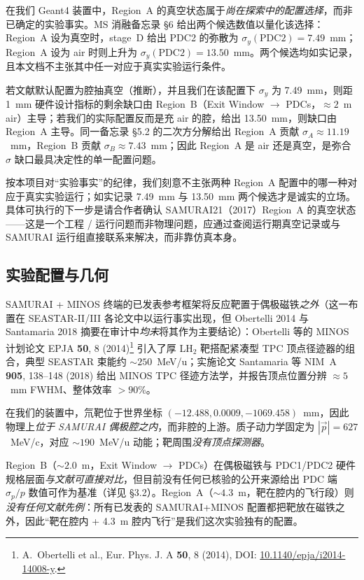 \documentclass[a4paper, 11pt]{article}
\begin{document}
在我们 Geant4 装置中，Region~A 的真空状态属于\emph{尚在探索中的配置选择}，而非已确定的实验事实。MS 消融备忘录 §6 给出两个候选数值以量化该选择：Region~A 设为真空时，stage~D 给出 PDC2 的弥散为 $\sigma_y(\text{PDC2}) = 7.49$~mm；Region~A 设为 air 时则上升为 $\sigma_y(\text{PDC2}) = 13.50$~mm。两个候选均如实记录，且本文档不主张其中任一对应于真实实验运行条件。

若文献默认配置为腔抽真空（推断），并且我们在该配置下 $\sigma_y$ 为 7.49~mm，则距 1~mm 硬件设计指标的剩余缺口由 Region~B（Exit Window $\to$ PDCs，$\approx 2$~m air）主导；若我们的实际配置反而是充 air 的腔，给出 13.50~mm，则缺口由 Region~A 主导。同一备忘录 §5.2 的二次方分解给出 Region~A 贡献 $\sigma_A \approx 11.19$~mm，Region~B 贡献 $\sigma_B \approx 7.43$~mm；因此 Region~A 是 air 还是真空，是弥合 $\sigma$ 缺口最具决定性的单一配置问题。

按本项目对“实验事实”的纪律，我们刻意不主张两种 Region~A 配置中的哪一种对应于真实实验运行；如实记录 7.49~mm 与 13.50~mm 两个候选才是诚实的立场。具体可执行的下一步是请合作者确认 SAMURAI21（2017）Region~A 的真空状态——这是一个工程 / 运行问题而非物理问题，应通过查阅运行期真空记录或与 SAMURAI 运行组直接联系来解决，而非靠仿真本身。

\subsection{实验配置与几何}
SAMURAI + MINOS 终端的已发表参考框架将反应靶置于偶极磁铁\emph{之外}（这一布置在 SEASTAR-II/III 各论文中以运行事实出现，但 Obertelli 2014 与 Santamaria 2018 摘要在审计中\emph{均未}将其作为主要结论）：Obertelli 等的 MINOS 计划论文 EPJA \textbf{50}, 8 (2014)\footnote{\label{fn:obertelli2014}A.~Obertelli et al., Eur. Phys. J. A \textbf{50}, 8 (2014), DOI: \href{https://doi.org/10.1140/epja/i2014-14008-y}{10.1140/epja/i2014-14008-y}.} 引入了厚 LH$_2$ 靶搭配紧凑型 TPC 顶点径迹器的组合，典型 SEASTAR 束能约 $\sim 250$~MeV/u；实施论文 Santamaria 等 NIM~A \textbf{905}, 138--148 (2018) 给出 MINOS TPC 径迹方法学，并报告顶点位置分辨 $\approx 5$~mm FWHM、整体效率 $> 90\%$。

在我们的装置中，氘靶位于世界坐标 $(-12.488, 0.0009, -1069.458)$~mm，因此物理上\emph{位于 SAMURAI 偶极腔之内}，而非腔的上游。质子动力学固定为 $|\vec p| = 627$~MeV/c，对应 $\sim 190$~MeV/u 动能；靶周围\emph{没有顶点探测器}。

Region~B（$\sim 2.0$~m，Exit Window $\to$ PDCs）在偶极磁铁与 PDC1/PDC2 硬件规格层面\emph{与文献可直接对比}，但目前没有任何已核验的公开来源给出 PDC 端 $\sigma_p/p$ 数值可作为基准（详见 §3.2）。Region~A（$\sim 4.3$~m，靶在腔内的飞行段）则\emph{没有任何文献先例}：所有已发表的 SAMURAI+MINOS 配置都把靶放在磁铁之外，因此“靶在腔内 + 4.3~m 腔内飞行”是我们这次实验独有的配置。
\end{document}
